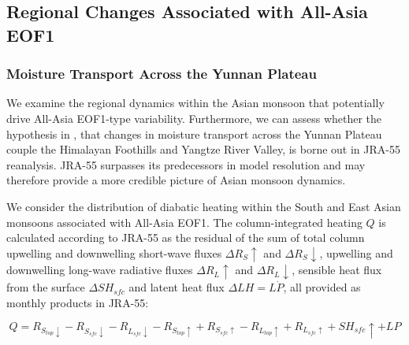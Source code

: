 
\subsection{Regional Changes Associated with All-Asia EOF1}

\subsubsection{Moisture Transport Across the Yunnan Plateau}

	We examine the regional dynamics within the Asian monsoon that potentially drive All-Asia EOF1-type variability. Furthermore, we can assess whether the hypothesis in \citet{Day2015}, that changes in moisture transport across the Yunnan Plateau couple the Himalayan Foothills and Yangtze River Valley, is borne out in JRA-55 reanalysis. JRA-55 surpasses its predecessors in model resolution and may therefore provide a more credible picture of Asian monsoon dynamics.
	
	
	We consider the distribution of diabatic heating within the South and East Asian monsoons associated with All-Asia EOF1. The column-integrated heating $Q$ is calculated according to JRA-55 as the residual of the sum of total column upwelling and downwelling short-wave fluxes $\Delta R_S\uparrow$ and $\Delta R_S\downarrow$, upwelling and downwelling long-wave radiative fluxes $\Delta R_L\uparrow$ and $\Delta R_L\downarrow$, sensible heat flux from the surface  $\Delta SH_{sfc}$ and latent heat flux  $\Delta LH=L \dot P$, all provided as monthly products in JRA-55:
	
\begin{equation}
	Q=R_{S_{top}\downarrow}-R_{S_{sfc}\downarrow}-R_{L_{sfc}\downarrow}-R_{S_{top}\uparrow}+R_{S_{sfc}\uparrow}-R_{L_{top}\uparrow}+R_{L_{sfc}\uparrow}+SH_{sfc}\uparrow+LP
\end{equation}
	
